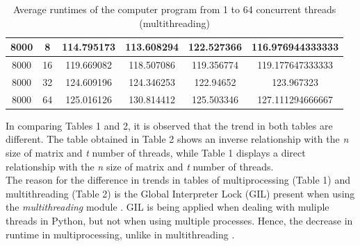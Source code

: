 \documentclass{article}
\begin{document}
\begin{table}[H]
{\begin{tabular}{|c|c|ccc|c|}
    8000                                                                                   & 8                                                                                                    & \multicolumn{1}{c|}{114.795173}       & \multicolumn{1}{c|}{113.608294}      & 122.527366      & 116.976944333333                                                                           \\ \hline
    8000                                                                                   & 16                                                                                                   & \multicolumn{1}{c|}{119.669082}       & \multicolumn{1}{c|}{118.507086}      & 119.356774      & 119.177647333333                                                                           \\ \hline
    8000                                                                                   & 32                                                                                                   & \multicolumn{1}{c|}{124.609196}       & \multicolumn{1}{c|}{124.346253}      & 122.94652       & 123.967323                                                                                 \\ \hline
    8000                                                                                   & 64                                                                                                   & \multicolumn{1}{c|}{125.016126}       & \multicolumn{1}{c|}{130.814412}      & 125.503346      & 127.111294666667                                                                           \\ \hline
    \end{tabular}}
    \caption{\label{table}Average runtimes of the computer program from 1 to 64 concurrent threads (multithreading)}
    \end{table}

\indent In comparing Tables 1 and 2, it is observed that the trend in both tables are different. The table obtained in Table 2 shows an inverse relationship with the \emph{n} size of matrix and \emph{t} number of threads, while Table 1 displays a direct relationship with the \emph{n} size of matrix and \emph{t} number of threads.\\
\indent The reason for the difference in trends in tables of multiprocessing (Table 1) and multithreading (Table 2) is the Global Interpreter Lock (GIL) present when using the \emph{multithreading} module \cite{intro, gil}. GIL is being applied when dealing with muliple threads in Python, but not when using multiple processes. Hence, the decrease in runtime in multiprocessing, unlike in multithreading \cite{GIL-thread}.
\end{document}
